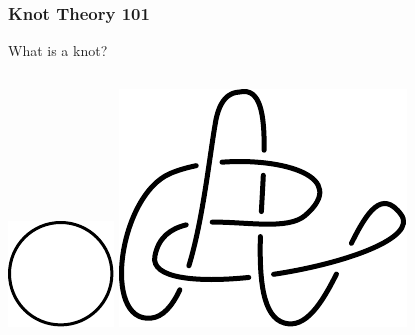 \documentclass{beamer}
\begin{document}
\begin{frame}
\frametitle{Knot Theory 101}
\begin{block}{}
What is a knot?
\end{block}
\pause
\begin{columns}[c]
\centering
\includegraphics[width=.8\textwidth]{knot_pix/unknot.pdf}
\pause
{}
\includegraphics[width=\textwidth]{knot_pix/untrivial-unknot.pdf}
\end{columns}
\end{frame}
\end{document}
